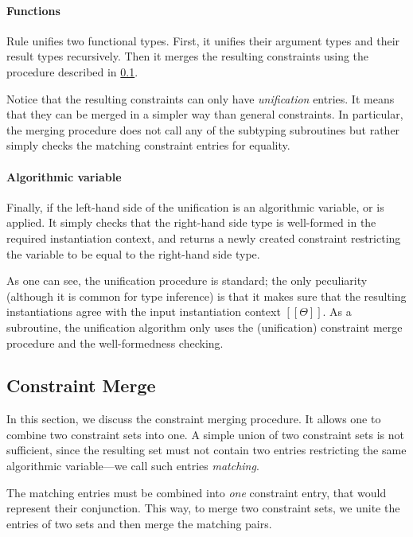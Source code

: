 \paragraph{Functions}
  Rule  unifies two functional types. 
  First, it unifies their argument types and their result types recursively.
  Then it merges the resulting constraints using the procedure described in \cref{sec:constraint-merge}.

  Notice that the resulting constraints can only have \emph{unification}
  entries. It means that they can be merged in a simpler way than general
  constraints. In particular, the merging procedure does not call any of the
  subtyping subroutines but rather simply checks the matching constraint entries
  for equality.

\paragraph{Algorithmic variable}
  Finally, if the left-hand side of the unification is an algorithmic variable,
   or  is applied. 
  It simply checks that the right-hand side type is well-formed in the required
  instantiation context, and returns a newly created constraint restricting the variable
  to be equal to the right-hand side type.

\vspace{\baselineskip}
As one can see, the unification procedure is standard; the only peculiarity
(although it is common for type inference) is that it makes sure that the resulting
instantiations agree with the input instantiation context $[[Θ]]$.  As a
subroutine, the unification algorithm only uses the (unification) constraint
merge procedure and the well-formedness checking.

\subsection{Constraint Merge}
\label{sec:constraint-merge}

In this section, we discuss the constraint merging procedure.
It allows one to combine two constraint sets into one. 
A simple union of two constraint sets is not sufficient, 
since the resulting set must not contain two entries restricting the 
same algorithmic variable---we call such entries \emph{matching}.

The matching entries must be combined into \emph{one} constraint entry, that
would represent their conjunction. This way, to merge two constraint sets, we
unite the entries of two sets and then merge the matching pairs.

